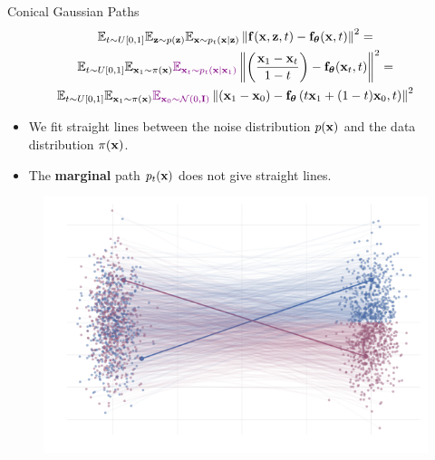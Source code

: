 \documentclass{beamer}
\begin{document}
\begin{frame}{Conical Gaussian Paths}
	\vspace{-0.5cm}
	\begin{multline*}
		\mathbb{E}_{t \sim U[0, 1]} \mathbb{E}_{\mathbf{z} \sim p(\mathbf{z})} \mathbb{E}_{\mathbf{x} \sim p_t(\mathbf{x} | \mathbf{z})}\left\| \mathbf{f}(\mathbf{x}, \mathbf{z}, t) - \mathbf{f}_{\boldsymbol{\theta}}(\mathbf{x}, t) \right\|^2 = \\
		\mathbb{E}_{t \sim U[0, 1]} \mathbb{E}_{\mathbf{x}_1 \sim \pi(\mathbf{x})} {\color{violet}\mathbb{E}_{\mathbf{x}_t \sim p_t(\mathbf{x} | \mathbf{x}_1)}}\left\| \left(\frac{\mathbf{x}_1 - \mathbf{x}_t}{1-t}\right) - \mathbf{f}_{\boldsymbol{\theta}}(\mathbf{x}_t, t) \right\|^2 = \\
		\mathbb{E}_{t \sim U[0, 1]} \mathbb{E}_{\mathbf{x}_1 \sim \pi(\mathbf{x})} {\color{violet}\mathbb{E}_{\mathbf{x}_0 \sim \mathcal{N}(0, \mathbf{I})}}\left\| (\mathbf{x}_1 - \mathbf{x}_0) - \mathbf{f}_{\boldsymbol{\theta}}\left(t \mathbf{x}_1 + (1 - t) \mathbf{x}_0, t\right) \right\|^2
	\end{multline*}
	\vspace{-0.5cm}
	\begin{itemize}
		\item We fit straight lines between the noise distribution $p(\mathbf{x})$ and the data distribution $\pi(\mathbf{x})$.
		\item The \textbf{marginal} path $p_t(\mathbf{x})$ does not give straight lines.
	\end{itemize}
	\vspace{-0.3cm}
	\begin{minipage}[t]{0.5\columnwidth}
			\begin{figure}
				\centering
				\includegraphics[width=\linewidth]{figs/g2g-vector-field-samples-cond}
			\end{figure}
		\end{minipage}%

\end{frame}
\end{document}
